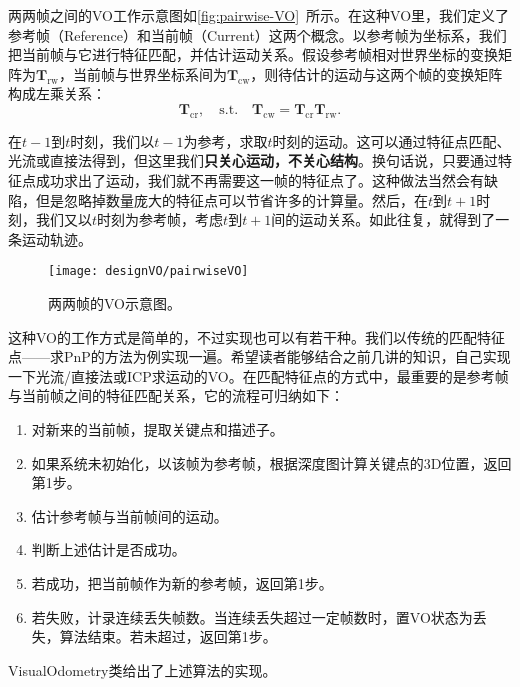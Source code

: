两两帧之间的VO工作示意图如\autoref{fig:pairwise-VO}~所示。在这种VO里，我们定义了参考帧（Reference）和当前帧（Current）这两个概念。以参考帧为坐标系，我们把当前帧与它进行特征匹配，并估计运动关系。假设参考帧相对世界坐标的变换矩阵为$\bm{T}_\mathrm{rw}$，当前帧与世界坐标系间为$\bm{T}_\mathrm{cw}$，则待估计的运动与这两个帧的变换矩阵构成左乘关系：
\[
\bm{T}_\mathrm{cr}, \quad \mathrm{s.t.} \quad \bm{T}_\mathrm{cw} = \bm{T}_\mathrm{cr} \bm{T}_\mathrm{rw}.
\]

在$t-1$到$t$时刻，我们以$t-1$为参考，求取$t$时刻的运动。这可以通过特征点匹配、光流或直接法得到，但这里我们\textbf{只关心运动，不关心结构}。换句话说，只要通过特征点成功求出了运动，我们就不再需要这一帧的特征点了。这种做法当然会有缺陷，但是忽略掉数量庞大的特征点可以节省许多的计算量。然后，在$t$到$t+1$时刻，我们又以$t$时刻为参考帧，考虑$t$到$t+1$间的运动关系。如此往复，就得到了一条运动轨迹。

\begin{figure}[!ht]
	\centering    
	\texttt{[image: designVO/pairwiseVO]}\\
	\caption{两两帧的VO示意图。}
	\label{fig:pairwise-VO}
\end{figure}

这种VO的工作方式是简单的，不过实现也可以有若干种。我们以传统的匹配特征点——求PnP的方法为例实现一遍。希望读者能够结合之前几讲的知识，自己实现一下光流/直接法或ICP求运动的VO。在匹配特征点的方式中，最重要的是参考帧与当前帧之间的特征匹配关系，它的流程可归纳如下：

\begin{mdframed}
\begin{enumerate}
	\item 对新来的当前帧，提取关键点和描述子。
	\item 如果系统未初始化，以该帧为参考帧，根据深度图计算关键点的3D位置，返回第1步。
	\item 估计参考帧与当前帧间的运动。
	\item 判断上述估计是否成功。
	\item 若成功，把当前帧作为新的参考帧，返回第1步。
	\item 若失败，计录连续丢失帧数。当连续丢失超过一定帧数时，置VO状态为丢失，算法结束。若未超过，返回第1步。
\end{enumerate}
\end{mdframed}

VisualOdometry类给出了上述算法的实现。

